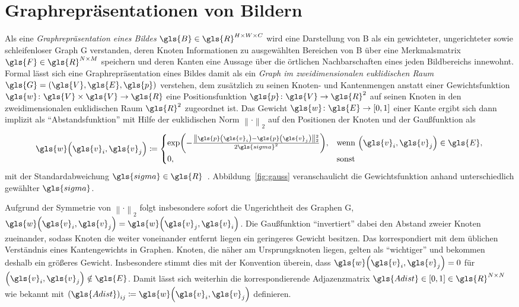 \chapter{Graphrepräsentationen von Bildern}
\label{graphrepraesentationen_von_bildern}

Als eine \emph{Graphrepräsentation eines Bildes} $\gls{B} \in \gls{R}^{H \times W \times C}$ wird eine Darstellung von \gls{B} als ein gewichteter, ungerichteter sowie schleifenloser Graph \gls{G} verstanden, deren Knoten Informationen zu ausgewählten Bereichen von \gls{B} über eine Merkmalsmatrix $\gls{F} \in \gls{R}^{N \times M}$ speichern und deren Kanten eine Aussage über die örtlichen Nachbarschaften eines jeden Bildbereichs innewohnt.
Formal lässt sich eine Graphrepräsentation eines Bildes damit als ein \emph{Graph im zweidimensionalen euklidischen Raum} $\gls{G} = \left(\gls{V}, \gls{E}, \gls{p}\right)$ verstehen, dem zusätzlich zu seinen Knoten- und Kantenmengen anstatt einer Gewichtsfunktion $\gls{w} \colon \gls{V} \times \gls{V} \to \gls{R}$ eine Positionsfunktion $\gls{p} \colon \gls{V} \to \gls{R}^2$ auf seinen Knoten in den zweidimensionalen euklidischen Raum $\gls{R}^2$ zugeordnet ist.
Das Gewicht $\gls{w} \colon \gls{E} \to \left[0, 1\right]$ einer Kante ergibt sich dann implizit als \enquote{Abstandsfunktion} mit Hilfe der euklidischen Norm $\left\|\cdot\right\|_2$ auf den Positionen der Knoten und der Gaußfunktion als
\begin{equation}
  \gls{w}\left(\gls{v}_i, \gls{v}_j\right) \coloneqq \begin{cases}
    \exp\left(-\frac{\left\|\gls{p}\left(\gls{v}_i\right) - \gls{p}\left(\gls{v}_j\right)\right\|_2^2}{2\gls{sigma}^2}\right), & \text{wenn }\left(\gls{v}_i, \gls{v}_j\right) \in \gls{E},\\
    0, & \text{sonst}
  \end{cases}
  \label{eq:gauss}
\end{equation}
mit der Standardabweichung $\gls{sigma} \in \gls{R}$~\cite{Shuman}.
Abbildung~\ref{fig:gauss} veranschaulicht die Gewichtsfunktion anhand unterschiedlich gewählter $\gls{sigma}$.

Aufgrund der Symmetrie von ${\left\|\cdot\right\|}_2$ folgt insbesondere sofort die Ungerichtheit des Graphen \gls{G}, \dhe{} $\gls{w}\left(\gls{v}_i, \gls{v}_j\right) = \gls{w}\left(\gls{v}_j, \gls{v}_i\right)$.
Die Gaußfunktion \enquote{invertiert} dabei den Abstand zweier Knoten zueinander, sodass Knoten die weiter voneinander entfernt liegen ein geringeres Gewicht besitzen.
Das korrespondiert mit dem üblichen Verständnis eines Kantengewichts in Graphen.
Knoten, die näher am Ursprungsknoten liegen, gelten als \enquote{wichtiger} und bekommen deshalb ein größeres Gewicht.
Insbesondere stimmt dies mit der Konvention überein, dass $\gls{w}\left(\gls{v}_i, \gls{v}_j\right) = 0$ für $\left(\gls{v}_i, \gls{v}_j\right) \notin \gls{E}$.
Damit lässt sich weiterhin die korrespondierende Adjazenzmatrix $\gls{Adist} \in \left[0, 1\right] \in \gls{R}^{N \times N}$ wie bekannt mit ${\left(\gls{Adist}\right)}_{ij} \coloneqq \gls{w}\left(\gls{v}_i, \gls{v}_j\right)$ definieren.

